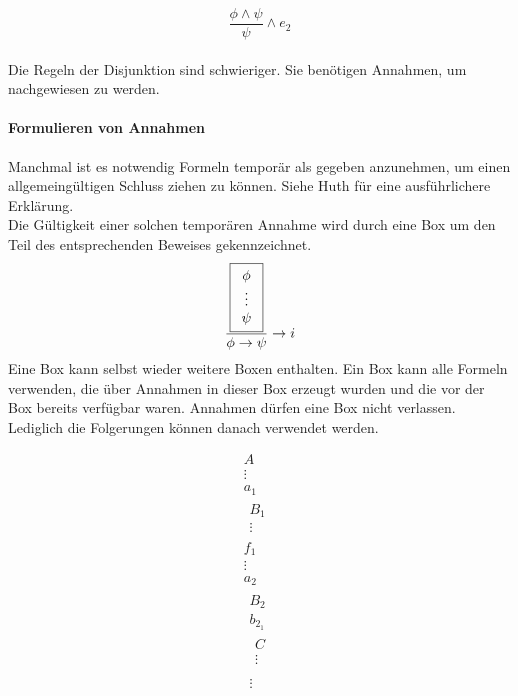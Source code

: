\begin{equation}
	\label{eq:e2Conjunction}
	\frac{\phi \wedge \psi}{\psi} \wedge e_2
\end{equation}
\\
Die Regeln der Disjunktion sind schwieriger.
Sie benötigen Annahmen, um nachgewiesen zu werden.

\paragraph{Formulieren von Annahmen}
Manchmal ist es notwendig Formeln temporär als gegeben anzunehmen, um einen allgemeingültigen Schluss ziehen zu können. Siehe Huth \cite[S.11]{huth2004logic} für eine  ausführlichere Erklärung.\\
Die Gültigkeit einer solchen temporären Annahme wird durch eine Box um den Teil des entsprechenden Beweises gekennzeichnet.\\
\begin{equation}
	\label{eq:iImplication}
	\frac{
		\boxed{ \begin{array}{c} 
			\phi\\
			\vdots\\
			\psi\\
		 \end{array} }
	}
	{\phi \rightarrow \psi} \rightarrow i
\end{equation}
Eine Box kann selbst wieder weitere Boxen enthalten.
Ein Box kann alle Formeln verwenden, die über Annahmen in dieser Box erzeugt wurden und die vor der Box bereits verfügbar waren.
Annahmen dürfen eine Box nicht verlassen. Lediglich die Folgerungen können danach verwendet werden.

\begin{equation}
	\boxed{\begin{array}{c}
		A\\
		\vdots\\
		a_1\\
		\boxed{\begin{array}{c}
		B_1\\
		\vdots
		\end{array}}\\
		f_1\\
		\vdots\\
		a_2\\
		\boxed{\begin{array}{c}
		B_2\\
		b_{2_1}\\
		\boxed{\begin{array}{c}
		C\\
		\vdots\\
		\end{array}}\\
		\vdots\\
		\end{array}}
	\end{array}}
\end{equation}

